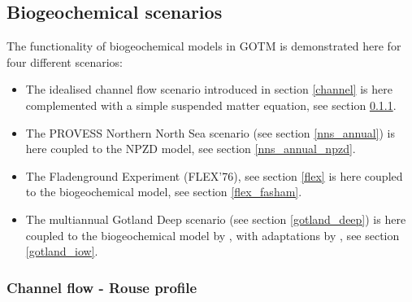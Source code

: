 %
%

\subsection{Biogeochemical scenarios}

The functionality of biogeochemical models in GOTM is demonstrated here for
four different scenarios:

\begin{itemize}
\item The idealised channel flow scenario introduced in
section \ref{channel} is here complemented with a simple suspended matter
equation, see section \ref{channel_rouse}.
\item The PROVESS Northern North Sea scenario (see section \ref{nns_annual})
is here coupled to the NPZD model, see section \ref{nns_annual_npzd}.
\item The Fladenground Experiment (FLEX'76), see section \ref{flex}
is here coupled to the \cite{Fashametal1990} biogeochemical model,
see section \ref{flex_fasham}.
\item The multiannual Gotland Deep scenario (see section \ref{gotland_deep}) 
is here
coupled to the biogeochemical model by \cite{Neumannetal2002},
with adaptations by \cite{Burchardetal05}, see section \ref{gotland_iow}.
\end{itemize}

\subsubsection{Channel flow - Rouse profile}\label{channel_rouse}


